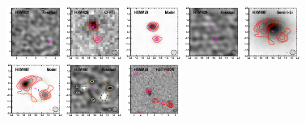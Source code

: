 \documentclass[iop]{emulateapj}
\begin{document}
\begin{figure}[!tbp]
\begin{centering}
\includegraphics[width=0.162\textwidth]{HXMM31_residual_bestfit.pdf}
\includegraphics[width=0.162\textwidth]{HXMM29_optical_bestfit.pdf}
\includegraphics[width=0.162\textwidth]{HXMM29_model_bestfit.pdf}
\includegraphics[width=0.162\textwidth]{HXMM29_residual_bestfit.pdf}
\includegraphics[width=0.162\textwidth]{HXMM07_optical_bestfit.pdf}
\includegraphics[width=0.162\textwidth]{HXMM07_model_bestfit.pdf}
\includegraphics[width=0.162\textwidth]{HXMM07_residual_bestfit.pdf}
\includegraphics[width=0.162\textwidth]{HXMM20_optical_bestfit.pdf}

\end{centering}
\end{figure}
\end{document}
